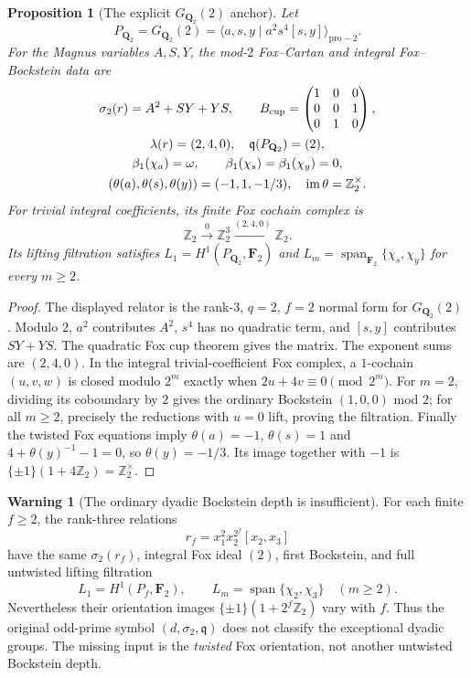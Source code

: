 \documentclass[11pt]{article}
\newtheorem{proposition}[theorem]{Proposition}
\theoremstyle{definition}
\newtheorem{warning}[theorem]{Warning}
\begin{document}
\begin{proposition}[The explicit $G_{\mathbf Q_2}(2)$ anchor]
\label{prop:dyadic-q2-explicit-anchor}
Let
\[
P_{\mathbf Q_2}=G_{\mathbf Q_2}(2)
=\langle a,s,y\mid a^2s^4[s,y]\rangle_{\mathrm{pro}-2}.
\]
For the Magnus variables $A,S,Y$, the mod-$2$
Fox--Cartan and integral Fox--Bockstein data are
\begin{equation}\label{eq:dyadic-q2-anchor-data}
\begin{gathered}
\sigma_2(r)=A^2+SY+YS,\qquad
B_{\rm cup}=
 \begin{pmatrix}1&0&0\\0&0&1\\0&1&0\end{pmatrix},\\
\lambda(r)=(2,4,0),\quad \mathfrak q(P_{\mathbf Q_2})=(2),\\
\beta_1(\chi_a)=\omega,\qquad
\beta_1(\chi_s)=\beta_1(\chi_y)=0,\\
(\theta(a),\theta(s),\theta(y))=
(-1,1,-1/3),\quad
\operatorname{im}\theta=\mathbb Z_2^\times.
\end{gathered}
\end{equation}
For trivial integral coefficients, its finite
Fox cochain complex is
\[
\mathbb Z_2\xrightarrow{0}\mathbb Z_2^3
 \xrightarrow{(2,4,0)}\mathbb Z_2.
\]
Its lifting filtration satisfies
$L_1=H^1(P_{\mathbf Q_2},\mathbf F_2)$ and
$L_m=\operatorname{span}_{\mathbf F_2}
\{\chi_s,\chi_y\}$ for every $m\ge2$.
\end{proposition}

\begin{proof}
The displayed relator is the rank-$3$, $q=2$,
$f=2$ normal form for $G_{\mathbf Q_2}(2)$
\cite{LabuteClassification,NSW,RoeTurtureanGQ2}.
Modulo $2$, $a^2$ contributes $A^2$,
$s^4$ has no quadratic term, and $[s,y]$
contributes $SY+YS$.
The quadratic Fox cup theorem gives the matrix.
The exponent sums are $(2,4,0)$.
In the integral trivial-coefficient Fox complex,
a $1$-cochain $(u,v,w)$ is closed modulo $2^m$
exactly when $2u+4v\equiv0\pmod{2^m}$.
For $m=2$, dividing its coboundary by $2$
gives the ordinary Bockstein $(1,0,0)$ mod $2$;
for all $m\ge2$, precisely the reductions with
$u=0$ lift, proving the filtration.
Finally the twisted Fox equations imply
$\theta(a)=-1$, $\theta(s)=1$ and
$4+\theta(y)^{-1}-1=0$, so
$\theta(y)=-1/3$.
Its image together with $-1$ is
$\{\pm1\}(1+4\mathbb Z_2)=\mathbb Z_2^\times$.
\end{proof}

\begin{warning}[The ordinary dyadic Bockstein depth is insufficient]
\label{warn:dyadic-bockstein-depth-insufficient}
For each finite $f\ge2$, the rank-three relations
\[
r_f=x_1^2x_2^{2^f}[x_2,x_3]
\]
have the same $\sigma_2(r_f)$, integral
Fox ideal $(2)$, first Bockstein, and full
untwisted lifting filtration
\[
L_1=H^1(P_f,\mathbf F_2),\qquad
L_m=\operatorname{span}\{\chi_2,\chi_3\}
\quad(m\ge2).
\]
Nevertheless their orientation images
$\{\pm1\}(1+2^f\mathbb Z_2)$ vary with $f$.
Thus the original odd-prime symbol
$(d,\sigma_2,\mathfrak q)$ does not classify
the exceptional dyadic groups.
The missing input is the \emph{twisted}
Fox orientation, not another untwisted
Bockstein depth.
\end{warning}
\end{document}

